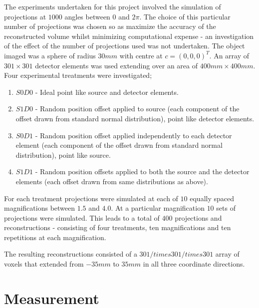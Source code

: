 \documentclass[
  twoside,
  11pt, a4paper,
  footinclude=true,
  headinclude=true,
  cleardoublepage=empty
]{scrbook}
\begin{document}
The experiments undertaken for this project involved the simulation of projections at $1000$ angles between $0$ and $2\pi$. The choice of this particular number of projections was chosen so as maximize the accuracy of the reconstructed volume whilst minimizing computational expense - an investigation of the effect of the number of projections used was not undertaken. The object imaged was a sphere of radius $30mm$ with centre at $c = (0,0,0)^T$. An array of $301\times301$ detector elements was used extending over an area of $400mm\times400mm$. Four experimental treatments were investigated;

\begin{enumerate}
\item $S0D0$ - Ideal point like source and detector elements.
\item $S1D0$ - Random position offset applied to source (each component of the offset drawn from standard normal distribution), point like detector elements.
\item $S0D1$ - Random position offset applied independently to each detector element (each component of the offset drawn from standard normal distribution), point like source.
\item $S1D1$ - Random position offsets applied to both the source and the detector elements (each offset drawn from same distributions as above).
\end{enumerate}

For each treatment projections were simulated at each of $10$ equally spaced magnifications between $1.5$ and $4.0$. At a particular magnification $10$ sets of projections were simulated. This leads to a total of $400$ projections and reconstructions - consisting of four treatments, ten magnifications and ten repetitions at each magnification.

The resulting reconstructions consisted of a $301/times301/times301$ array of voxels that extended from $-35mm$ to $35mm$ in all three coordinate directions.

\section{Measurement}
\end{document}
